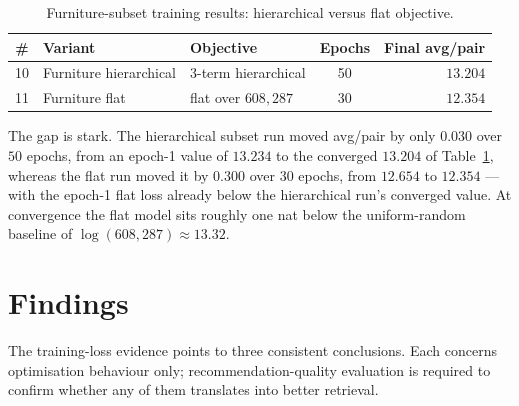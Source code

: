 \begin{table}[ht]
  \centering
  \caption{Furniture-subset training results: hierarchical versus flat
           objective.}
  \label{tab:emb-furniture}
  \begin{tabular}{cllcr}
    \toprule
    \# & Variant & Objective & Epochs & Final avg/pair \\
    \midrule
    10 & Furniture hierarchical & 3-term hierarchical     & 50 & $13.204$ \\
    11 & Furniture flat         & flat over $608{,}287$    & 30 & $12.354$ \\
    \bottomrule
  \end{tabular}
\end{table}

The gap is stark. The hierarchical subset run moved avg/pair by only $0.030$
over $50$ epochs, from an epoch-1 value of $13.234$ to the converged $13.204$ of
Table~\ref{tab:emb-furniture}, whereas the flat run moved it by $0.300$ over $30$
epochs, from $12.654$ to $12.354$ --- with the epoch-1 flat loss already below
the hierarchical run's converged value. At convergence the flat model
sits roughly one nat below the uniform-random baseline of
$\log(608{,}287)\approx 13.32$.

\section{Findings}
\label{sec:emb-findings}

The training-loss evidence points to three consistent conclusions. Each
concerns optimisation behaviour only; recommendation-quality evaluation is
required to confirm whether any of them translates into better retrieval.

